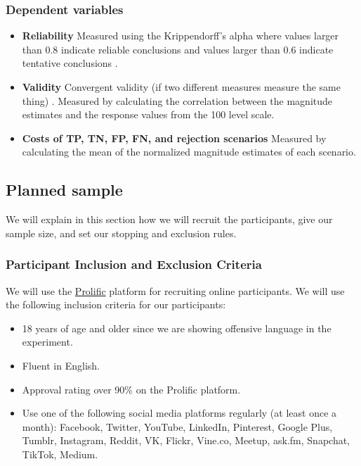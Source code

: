 \documentclass[a4paper]{article}
\begin{document}
\subsubsection{Dependent variables}
\begin{itemize}
    \item \textbf{Reliability} Measured using the Krippendorff's alpha where values larger than 0.8 indicate reliable conclusions and values larger than 0.6 indicate tentative conclusions \cite{krippendorff2004reliability}.
    \item \textbf{Validity} Convergent validity (if two different measures measure the same thing) \cite{fitzner2007reliability}. Measured by calculating the correlation between the magnitude estimates and the response values from the 100 level scale.
    \item \textbf{Costs of TP, TN, FP, FN, and rejection scenarios} Measured by calculating the mean of the normalized magnitude estimates of each scenario.
\end{itemize}

\subsection{Planned sample}
We will explain in this section how we will recruit the participants, give our sample size, and set our stopping and exclusion rules.

\subsubsection{Participant Inclusion and Exclusion Criteria}
We will use the \href{https://prolific.co}{Prolific} platform for recruiting online participants. We will use the following inclusion criteria for our participants:
\begin{itemize}
    \item 18 years of age and older since we are showing offensive language in the experiment.
    \item Fluent in English.
    \item Approval rating over 90\% on the Prolific platform.
    \item Use one of the following social media platforms regularly (at least once a month): Facebook, Twitter, YouTube, LinkedIn, Pinterest, Google Plus, Tumblr, Instagram, Reddit, VK, Flickr, Vine.co, Meetup, ask.fm, Snapchat, TikTok, Medium.
\end{itemize}
\end{document}
